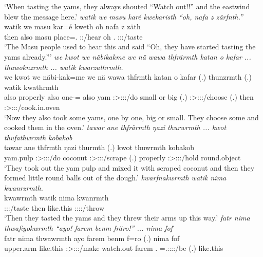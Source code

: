 \begin{exe}
	\trans `When tasting the yams, they always shouted ``Watch out!!'' and the eastwind blew the message here.'
	\emph{watik we masu karé kwekaristh ``oh, nafa z zärfnth.''}\\
	\gll watik we masu kar=é kweth oh nafa z zäth\\ 
	then also masu place=\Erg.{\Nsg} \Stpl:\Sbj:\Iter/hear oh \Tnsg.{\Erg} {\Iam} \Stpl:\Sbj:\Rpst:\Pfv/taste\\
	\trans `The Masu people used to hear this and said ``Oh, they have started tasting the yams already.'''
	\emph{we kwot we näbikakme we nä wawa thfrärmth katan o kafar ... thuwoknzrmth ... watik kwarzathrmth.}\\
	\gll we kwot we näbi-kak=me we nä wawa thfrmth katan o kafar (.) thunzrmth (.) watik kwathrmth\\ 
	also properly also one-\Distr={\Ins} also {\Indf} yam \Stpl:\Sbj>\Stpl:\Obj:\Pst:\Dur/do small or big (.) \Stpl:\Sbj>\Stpl:\Obj:\Pst:\Dur/choose (.) then \Stpl:\Sbj>\Stpl:\Obj:\Pst:\Dur/cook.in.oven\\
	\trans `Now they also took some yams, one by one, big or small. They choose some and cooked them in the oven.'
	\emph{tawar ane thfrärmth ŋazi thurwrmth ... kwot thufathwrmth kobakob}\\
	\gll tawar ane thfrmth ŋazi thurmth (.) kwot thuwrmth kobakob\\ 
	yam.pulp {\Dem} \Stpl:\Sbj>\Stpl:\Obj:\Pst:\Dur/do coconut \Stpl:\Sbj>\Stpl:\Obj:\Pst:\Dur/scrape (.) properly \Stpl:\Sbj>\Stpl:\Obj:\Pst:\Dur/hold round.object\\
	\trans `They took out the yam pulp and mixed it with scraped coconut and then they formed little round balls out of the dough.'
	\emph{kwarfnakwrmth watik nima kwanrzrmth.}\\
	\gll kwawrmth watik nima kwanrmth\\ 
	\Sg:\Sbj:\Pst:\Dur/taste then like.this \Sg:\Sbj:\Pst:\Dur:\Venit/throw\\
	\trans `Then they tasted the yams and they threw their arms up this way.'
	\emph{fatr nima thwafiyokwrmth ``ayo! farem benm fräro!'' ... nima fof}\\
	\gll fatr nima thwawrmth ayo farem benm f=ro (.) nima fof\\ 
	upper.arm like.this \Stpl:\Sbj>\Stpl:\Obj:\Pst:\Dur/make watch.out farem \Snsg.{\Dat} \Dist=\Tsg.\F:\Sbj:\Nonpast:\Ipfv:\Andat/be (.) like.this {\Emph}\\

\end{exe}
